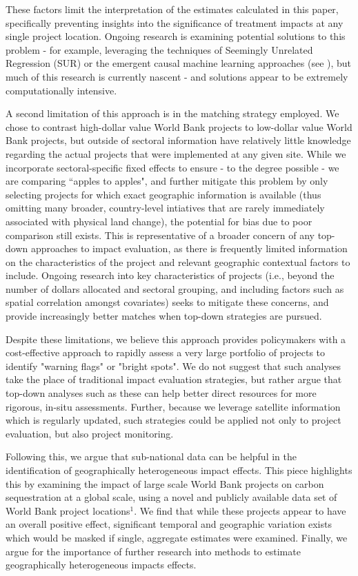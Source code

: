 \documentclass{article}\usepackage[]{graphicx}\usepackage[]{color}
\newenvironment{knitrout}{}{}  %
\begin{document}
\begin{knitrout}
These factors limit the interpretation of the estimates calculated in this paper, specifically preventing insights into the significance of treatment impacts at any single project location.
Ongoing research is examining potential solutions to this problem - for example, leveraging the techniques of Seemingly Unrelated Regression (SUR) or the emergent causal machine learning approaches (see \cite{athey_recursive_2015}), but much of this research is currently nascent - and solutions appear to be extremely computationally intensive.
\par
A second limitation of this approach is in the matching strategy employed.
We chose to contrast high-dollar value World Bank projects to low-dollar value World Bank projects, but outside of sectoral information have relatively little knowledge regarding the actual projects that were implemented at any given site. 
While we incorporate sectoral-specific fixed effects to ensure - to the degree possible - we are comparing  ``apples to apples", and further mitigate this problem by only selecting projects for which exact geographic information is available (thus omitting many broader, country-level intiatives that are rarely immediately associated with physical land change), the potential for bias due to poor comparison still exists.
This is representative of a broader concern of any top-down approaches to impact evaluation, as there is frequently limited information on the characteristics of the project and relevant geographic contextual factors to include.
Ongoing research into key characteristics of projects (i.e., beyond the number of dollars allocated and sectoral grouping, and including factors such as spatial correlation amongst covariates) seeks to mitigate these concerns, and provide increasingly better matches when top-down strategies are pursued.
\par
Despite these limitations, we believe this approach provides policymakers with a cost-effective approach to rapidly assess a very large portfolio of projects to identify "warning flags" or "bright spots".  
We do not suggest that such analyses take the place of traditional impact evaluation strategies, but rather argue that top-down analyses such as these can help better direct resources for more rigorous, in-situ assessments.
Further, because we leverage satellite information which is regularly updated, such strategies could be applied not only to project evaluation, but also project monitoring.
\par
Following this, we argue that sub-national data can be helpful in the identification of geographically heterogeneous impact effects. 
This piece highlights this by examining the impact of large scale World Bank projects on carbon sequestration at a global scale, using a novel and publicly available data set of World Bank project locations\begin{math}^{1}\end{math}.  
We find that while these projects appear to have an overall positive effect, significant temporal and geographic variation exists which would be masked if single, aggregate estimates were examined.
Finally, we argue for the importance of further research into methods to estimate geographically heterogeneous impacts effects.


\end{knitrout}
\end{document}

